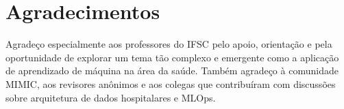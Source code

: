 \documentclass{ieeeaccess}
\begin{document}
\section*{Agradecimentos}
Agradeço especialmente aos professores do IFSC pelo apoio, orientação e pela oportunidade de explorar um tema tão complexo e emergente como a aplicação de aprendizado de máquina na área da saúde. Também agradeço à comunidade MIMIC, aos revisores anônimos e aos colegas que contribuíram com discussões sobre arquitetura de dados hospitalares e MLOps.




\EOD
\end{document}
